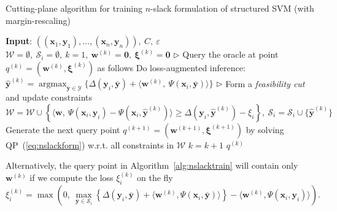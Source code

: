 \documentclass[9pt]{extarticle}
\DeclareMathOperator*{\argmax}{argmax}
\begin{document}
\begin{algorithm}[htbp]
\caption{Cutting-plane algorithm for training $n$-slack formulation of structured SVM (with margin-rescaling)}
\label{alg:nslacktrain}
\begin{algorithmic}[1]
\STATE \textbf{Input}: $\left( (\mathbf{x}_1, \mathbf{y}_1), \dots, (\mathbf{x}_n, \mathbf{y}_n) \right),~ C,~ \varepsilon$
\STATE $\mathcal{W} = \emptyset,~\mathcal{S}_i = \emptyset,~ k = 1,~ \mathbf{w}^{(k)} = \mathbf{0},~ \bm{\xi}^{(k)} = \mathbf{0}$
\REPEAT
        \STATE $\triangleright$ Query the oracle at point $q^{(k)} = (\mathbf{w}^{(k)}, \bm{\xi}^{(k)})$ as follows
        \STATE Do loss-augmented inference:~
               $\hat{\mathbf{y}}^{(k)} = \argmax_{\bar{\mathbf{y}} \in \mathcal{Y}} \{ \Delta(\mathbf{y}_i, \bar{\mathbf{y}}) + 
                \langle \mathbf{w}^{(k)},~ \Psi(\mathbf{x}_i, \bar{\mathbf{y}}) \rangle \}$ 
            \STATE $\triangleright$ Form a \emph{feasibility cut} and update constraints
            \STATE $\mathcal{W} = \mathcal{W} \cup 
                    \left\{ \langle \mathbf{w},~ \Psi(\mathbf{x}_i, \mathbf{y}_i) - \Psi(\mathbf{x}_i, \hat{\mathbf{y}}^{(k)}) \rangle \ge 
                    \Delta(\mathbf{y}_i, \hat{\mathbf{y}}^{(k)}) - \xi_i \right\},~ \mathcal{S}_i = \mathcal{S}_i \cup \{\hat{\mathbf{y}}^{(k)} \}$ 
            \STATE Generate the next query point $q^{(k+1)} = (\mathbf{w}^{(k+1)}, \bm{\xi}^{(k+1)})$ 
                   by solving QP~(\ref{eq:nslackform}) w.r.t. all constraints in $\mathcal{W}$
            \STATE $k = k+1$
        \ENDIF
    \ENDFOR
\RETURN $q^{(k)}$
\end{algorithmic}
\end{algorithm}

Alternatively, the query point in Algorithm~\ref{alg:nslacktrain} will contain only $\mathbf{w}^{(k)}$
if we compute the loss $\xi_i^{(k)}$ on the fly~\cite{tsochantaridis2004support}
\begin{equation*}
\xi_i^{(k)} = \max \left( 0,~ 
              \max_{\bar{\mathbf{y}} \in \mathcal{S}_i} 
              \left\{ \Delta(\mathbf{y}_i, \bar{\mathbf{y}}) + \langle \mathbf{w}^{(k)}, \Psi(\mathbf{x}_i, \bar{\mathbf{y}}) \rangle \right\} -
              \langle \mathbf{w}^{(k)}, \Psi(\mathbf{x}_i, \mathbf{y}_i) \rangle \right).
\end{equation*}
\end{document}
